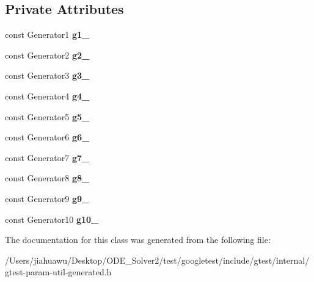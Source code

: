 \subsection*{Private Attributes}
\begin{DoxyCompactItemize}
\item 
\mbox{\label{classtesting_1_1internal_1_1_cartesian_product_holder10_a5245be8030d0a6f728636447bc1cf8f4}} 
const Generator1 {\bfseries g1\+\_\+}
\item 
\mbox{\label{classtesting_1_1internal_1_1_cartesian_product_holder10_a7cc917fc3bd30ffd2dfbeadbdee8dd15}} 
const Generator2 {\bfseries g2\+\_\+}
\item 
\mbox{\label{classtesting_1_1internal_1_1_cartesian_product_holder10_a5decf155de93ea84e0140f8df29f07bf}} 
const Generator3 {\bfseries g3\+\_\+}
\item 
\mbox{\label{classtesting_1_1internal_1_1_cartesian_product_holder10_afd929d5307f5c1a96779984b1fa80f79}} 
const Generator4 {\bfseries g4\+\_\+}
\item 
\mbox{\label{classtesting_1_1internal_1_1_cartesian_product_holder10_a1bb10afd785cd8ac642d25476799ffe9}} 
const Generator5 {\bfseries g5\+\_\+}
\item 
\mbox{\label{classtesting_1_1internal_1_1_cartesian_product_holder10_a87bbc83960add56e3ff211d60cdc4fe2}} 
const Generator6 {\bfseries g6\+\_\+}
\item 
\mbox{\label{classtesting_1_1internal_1_1_cartesian_product_holder10_a75259b2cb4a948bcfbba73d8172094ee}} 
const Generator7 {\bfseries g7\+\_\+}
\item 
\mbox{\label{classtesting_1_1internal_1_1_cartesian_product_holder10_a36ca15e2c00185d4a584ab27c40bfafe}} 
const Generator8 {\bfseries g8\+\_\+}
\item 
\mbox{\label{classtesting_1_1internal_1_1_cartesian_product_holder10_a53dcc18bd666a15fbb89eefb279f7fec}} 
const Generator9 {\bfseries g9\+\_\+}
\item 
\mbox{\label{classtesting_1_1internal_1_1_cartesian_product_holder10_a71670bf8a60fe6e01dcc5278e089fc6c}} 
const Generator10 {\bfseries g10\+\_\+}
\end{DoxyCompactItemize}


The documentation for this class was generated from the following file\+:\begin{DoxyCompactItemize}
\item 
/\+Users/jiahuawu/\+Desktop/\+O\+D\+E\+\_\+\+Solver2/test/googletest/include/gtest/internal/gtest-\/param-\/util-\/generated.\+h\end{DoxyCompactItemize}
